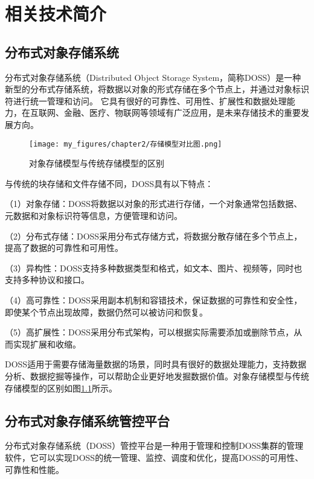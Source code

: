 \chapter{相关技术简介}

\section{分布式对象存储系统}

分布式对象存储系统（Distributed Object Storage System，简称DOSS）是一种新型的分布式存储系统，将数据以对象的形式存储在多个节点上，并通过对象标识符进行统一管理和访问。
它具有很好的可靠性、可用性、扩展性和数据处理能力\cite{kongeji}，在互联网、金融、医疗、物联网等领域有广泛应用，是未来存储技术的重要发展方向。

\begin{figure}[h]
    \centering
    \texttt{[image: my\_figures/chapter2/存储模型对比图.png]}
    \caption{对象存储模型与传统存储模型的区别}
    \label{fig:/存储模型对比图}
\end{figure}

与传统的块存储和文件存储不同，DOSS具有以下特点：

（1）对象存储：DOSS将数据以对象的形式进行存储，一个对象通常包括数据、元数据和对象标识符等信息，方便管理和访问。

（2）分布式存储：DOSS采用分布式存储方式，将数据分散存储在多个节点上，提高了数据的可靠性和可用性。

（3）异构性：DOSS支持多种数据类型和格式，如文本、图片、视频等，同时也支持多种协议和接口\cite{kongqng2015keji}。

（4）高可靠性：DOSS采用副本机制和容错技术，保证数据的可靠性和安全性，即使某个节点出现故障，数据仍然可以被访问和恢复。

（5）高扩展性：DOSS采用分布式架构，可以根据实际需要添加或删除节点，从而实现扩展和收缩。

DOSS适用于需要存储海量数据的场景，同时具有很好的数据处理能力，支持数据分析、数据挖掘等操作，可以帮助企业更好地发掘数据价值。对象存储模型与传统存储模型的区别如图\ref{fig:/存储模型对比图}所示。




\section{分布式对象存储系统管控平台}

分布式对象存储系统（DOSS）管控平台是一种用于管理和控制DOSS集群的管理软件，它可以实现DOSS的统一管理、监控、调度和优化，提高DOSS的可用性、可靠性和性能\cite{kongqineji}。


